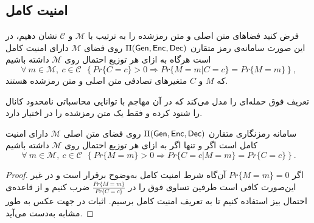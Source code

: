 \subsection*{امنیت کامل}
\begin{definition}
	\label{psecure}
	فرض کنید فضاهای متن اصلی و متن رمز‌شده را به ترتیب با 
	$\mathcal{M}$
	و 
	$\mathcal{C}$
	 نشان دهیم، در این صورت سامانه‌ی رمز متقارن
	 $\Pi(\mathsf{Gen}, \mathsf{Enc}, \mathsf{Dec})$
	 روی فضای 
	 $\mathcal{M}$
	 دارای امنیت کامل است هرگاه به ازای هر توزیع احتمال روی 
	 $\mathcal{M}$
	 داشته باشیم
	 $$\forall \ m\in\mathcal{M}, \ c\in\mathcal{C} \  \ \left \{Pr\{C = c\} > 0 \Rightarrow Pr\{M = m|C = c\} = Pr\{M = m\}\right\},$$
	 که 
	 $M$
	 و 
	 $C$
	 متغیرهای تصادفی متن اصلی و متن رمز‌شده هستند. 
\end{definition}
تعریف فوق حمله‌ای را مدل می‌کند که در آن مهاجم با توانایی محاسباتی نامحدود کانال را شنود کرده و فقط یک متن رمز‌شده را در اختیار دارد. 
\begin{lemma}
	\label{psecure1}
سامانه‌  رمزنگاری متقارن 
$\Pi(\mathsf{Gen}, \mathsf{Enc}, \mathsf{Dec})$
روی فضای متن اصلی 
$\mathcal{M}$
دارای امنیت کامل است اگر و تنها اگر به ازای هر توزیع احتمال روی 
$\mathcal{M}$
داشته باشیم
$$\forall \ m\in\mathcal{M}, \ c\in\mathcal{C} \  \ \left\{Pr\{M = m\} > 0 \Rightarrow Pr\{C = c|M = m\} = Pr\{C = c\}\right\}.$$
\begin{proof}
	
اگر 
$Pr\{M = m\} = 0$
آ‌ن‌گاه شرط امنیت کامل به‌وضوح  برقرار است و در غیر این‌صورت
کافی است طرفین تساوی فوق را در 
$\frac{Pr\{M = m\}}{Pr\{C = c\}}$
ضرب کنیم و از قاعده‌ی احتمال بیز استفاده کنیم تا به تعریف امنیت کامل برسیم. اثبات در جهت عکس به طور مشابه به‌دست  می‌آید.
\end{proof}
\end{lemma}

